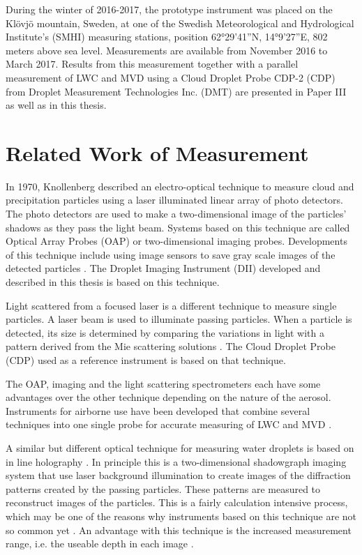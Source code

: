 During the winter of 2016-2017, the prototype instrument was placed on the Klövjö mountain, Sweden, at one of the Swedish Meteorological and Hydrological Institute's (SMHI) measuring stations, position 62°29'41''N, 14°9'27''E, 802 meters above sea level. Measurements are available from November 2016 to March 2017. Results from this measurement together with a parallel measurement of LWC and MVD using a Cloud Droplet Probe CDP-2 (CDP) from Droplet Measurement Technologies Inc. (DMT) are presented in Paper III as well as in this thesis.

\section{Related Work of Measurement}
\label{sec:relwork}
In 1970, Knollenberg \cite{knoll1970} described an electro-optical technique to measure cloud and precipitation particles using a laser illuminated linear array of photo detectors. The photo detectors are used to make a two-dimensional image of the particles’ shadows as they pass the light beam. Systems based on this technique are called Optical Array Probes (OAP) or two-dimensional imaging probes. Developments of this technique include using image sensors to save gray scale images of the detected particles \cite{kulk2011,wend2013}. The Droplet Imaging Instrument (DII) developed and described in this thesis is based on this technique.

Light scattered from a focused laser \cite{baum1983,dye1984} is a different technique to measure single particles. A laser beam is used to illuminate passing particles. When a particle is detected, its size is determined by comparing the variations in light with a pattern derived from the Mie scattering solutions \cite{mie1908}. The Cloud Droplet Probe (CDP) used as a reference instrument is based on that technique.

The OAP, imaging and the light scattering spectrometers each have some advantages over the other technique depending on the nature of the aerosol. Instruments for airborne use have been developed that combine several techniques into one single probe for accurate measuring of LWC and MVD \cite{baum2001, baum2011}.

A similar but different optical technique for measuring water droplets is based on in line holography \cite{laws1995}. In principle this is a two-dimensional shadowgraph imaging system that use laser background illumination to create images of the diffraction patterns created by the passing particles. These patterns are measured to reconstruct images of the particles. This is a fairly calculation intensive process, which may be one of the reasons why instruments based on this technique are not so common yet \cite{henn2013}. An advantage with this technique is the increased measurement range, i.e. the useable depth in each image \cite{kaikk2014}.

